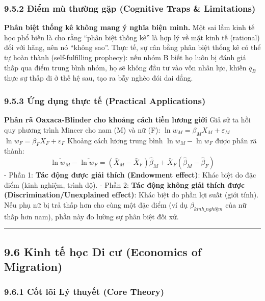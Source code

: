 \documentclass[
]{article}
\begin{document}
\subsubsection{9.5.2 Điểm mù thường gặp (Cognitive Traps \&
Limitations)}\label{ux111iux1ec3m-muxf9-thux1b0ux1eddng-gux1eb7p-cognitive-traps-limitations-73}

\textbf{Phân biệt thống kê không mang ý nghĩa biện minh.} Một sai lầm
kinh tế học phổ biến là cho rằng ``phân biệt thống kê'' là hợp lý về mặt
kinh tế (rational) đối với hãng, nên nó ``không sao''. Thực tế, sự cân
bằng phân biệt thống kê có thể tự hoàn thành (self-fulfilling prophecy):
nếu nhóm B biết họ luôn bị đánh giá thấp qua điểm trung bình nhóm, họ sẽ
không đầu tư vào vốn nhân lực, khiến \(\bar{q}_B\) thực sự thấp đi ở thế
hệ sau, tạo ra bẫy nghèo đói dai dẳng.

\subsubsection{9.5.3 Ứng dụng thực tế (Practical
Applications)}\label{ux1ee9ng-dux1ee5ng-thux1ef1c-tux1ebf-practical-applications-37}

\textbf{Phân rã Oaxaca-Blinder cho khoảng cách tiền lương giới} Giả sử
ta hồi quy phương trình Mincer cho nam (M) và nữ (F):
\(\ln w_M = \beta_M X_M + \varepsilon_M\)
\(\ln w_F = \beta_F X_F + \varepsilon_F\) Khoảng cách lương trung bình
\(\overline{\ln w_M} - \overline{\ln w_F}\) được phân rã thành:
\[ \overline{\ln w_M} - \overline{\ln w_F} = (\bar{X}_M - \bar{X}_F)\hat{\beta}_M + \bar{X}_F(\hat{\beta}_M - \hat{\beta}_F) \]
- Phần 1: \textbf{Tác động được giải thích (Endowment effect)}: Khác
biệt do đặc điểm (kinh nghiệm, trình độ). - Phần 2: \textbf{Tác động
không giải thích được (Discrimination/Unexplained effect)}: Khác biệt do
phần lợi suất (giới tính). Nếu phụ nữ bị trả thấp hơn cho cùng một đặc
điểm (ví dụ \(\beta_{kinh\_nghiệm}\) của nữ thấp hơn nam), phần này đo
lường sự phân biệt đối xử.

\begin{center}\rule{0.5\linewidth}{0.5pt}\end{center}

\subsection{9.6 Kinh tế học Di cư (Economics of
Migration)}\label{kinh-tux1ebf-hux1ecdc-di-cux1b0-economics-of-migration}

\subsubsection{9.6.1 Cốt lõi Lý thuyết (Core
Theory)}\label{cux1ed1t-luxf5i-luxfd-thuyux1ebft-core-theory-37}
\end{document}
